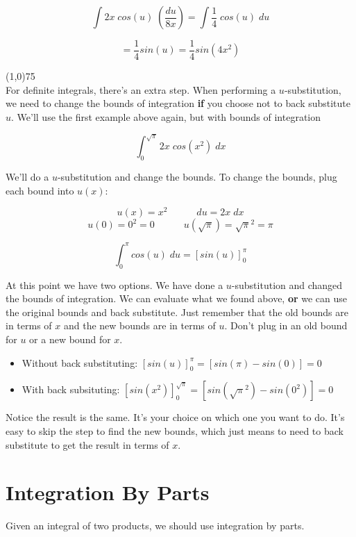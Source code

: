 \documentclass[12pt]{report}
\begin{document}
$$ \int 2x \; cos(u) \;  \left( \frac{du}{8x} \right) = \int \frac{1}{4} \; cos(u) \; du $$

$$ = \frac{1}{4} sin(u) = \frac{1}{4} sin(4x^2) $$ 



\line(1,0){75} \\

For definite integrals, there's an extra step. When performing a $u$-substitution, we need to change the bounds of integration \textbf{if} you choose not to back substitute $u$. We'll use the first example above again, but with bounds of integration

$$ \int_0^{\sqrt{\pi}} 2x \; cos(x^2) \; dx $$

We'll do a $u$-substitution and change the bounds. To change the bounds, plug each bound into $ u(x) $:

$$ u(x) = x^2 \quad \quad \quad du = 2x \; dx $$
$$ u(0) = 0^2 = 0 \quad \quad \quad u \left( \sqrt{\pi} \right) = \sqrt{\pi}^2 = \pi $$

$$ \int_0^{\pi} cos(u) \; du = \left[sin(u)\right]_{0}^{\pi} $$

At this point we have two options. We have done a $u$-substitution and changed the bounds of integration. We can evaluate what we found above, \textbf{or} we can use the original bounds and back substitute. Just remember that the old bounds are in terms of $x$ and the new bounds are in terms of $u$. Don't plug in an old bound for $u$ or a new bound for $x$. \\

\begin{itemize}
	\item[] Without back substituting: $ \left[sin(u)\right]_{0}^{\pi} = \left[sin(\pi) - sin(0)\right] = 0 $
	\item[] With back subsituting: $ \left[ sin(x^2) \right]_{0}^{\sqrt{\pi}} = \left[sin(\sqrt{\pi}^2) - sin(0^2) \right] = 0 $
\end{itemize}

Notice the result is the same. It's your choice on which one you want to do. It's easy to skip the step to find the new bounds, which just means to need to back substitute to get the result in terms of $x$.

\clearpage


\section{Integration By Parts}
Given an integral of two products, we should use integration by parts. \\
\end{document}
